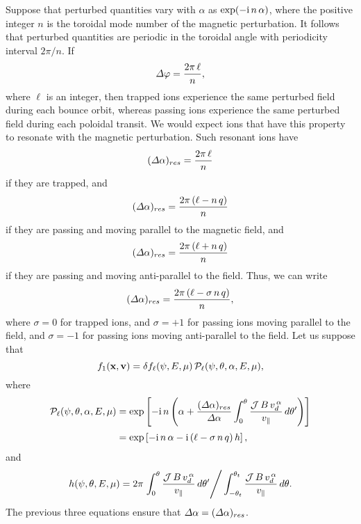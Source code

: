 \documentclass[12pt,prb,aps,notitlepage]{revtex4-1}
\begin{document}
 Suppose that perturbed quantities vary with $\alpha$ as $\exp(-{\rm i}\,n\,\alpha)$, where the positive integer $n$ is the toroidal
 mode number of the magnetic perturbation. It follows that perturbed quantities are periodic in the toroidal angle with periodicity interval $2\pi/n$. If
 \begin{equation}
 {\mit\Delta}\varphi = \frac{2\pi\,\ell}{n},
 \end{equation}
 where $\ell$ is an integer, then trapped ions experience the same perturbed field during each  bounce orbit, whereas passing
 ions experience the same perturbed field during each poloidal transit.  We would expect ions that have this property to resonate with the
 magnetic perturbation. Such resonant ions have
 \begin{equation}
 ({\mit\Delta}\alpha)_{res} = \frac{2\pi\,\ell}{n}
 \end{equation}
 if they are trapped, and 
 \begin{equation}
 ({\mit\Delta}\alpha)_{res} = \frac{2\pi\,(\ell-n\,q)}{n}
 \end{equation}
 if they are passing and moving parallel to the magnetic field, and 
  \begin{equation}
 ({\mit\Delta}\alpha)_{res} = \frac{2\pi\,(\ell+n\,q)}{n}
 \end{equation}
 if they are passing and  moving anti-parallel to the field.
Thus, we can write
  \begin{equation}
 ({\mit\Delta}\alpha)_{res} = \frac{2\pi\,(\ell-\sigma\,n\,q)}{n},
 \end{equation}
 where $\sigma=0$ for trapped ions, and $\sigma=+1$ for passing ions moving parallel to the field, and $\sigma=-1$ for passing ions moving anti-parallel to the field. Let us suppose that
 \begin{equation}\label{e83}
 f_1({\bf x},{\bf v})= \delta f_{\ell}(\psi,E,\mu)\,{\cal P}_{\ell}(\psi,\theta,\alpha,E,\mu),
 \end{equation}
 where
 \begin{align}
 {\cal P}_\ell(\psi,\theta,\alpha,E,\mu)& = \exp\left[-{\rm i}\,n\left(\alpha + \frac{({\mit\Delta}\alpha)_{res}}{{\mit\Delta}\alpha}\int_0^\theta\frac{{\cal J}\,B\,v_d^{\,\alpha}}{v_\parallel}\, d\theta'\right)\right]\nonumber\\[0.5ex]
 & = \exp\left[-{\rm i}\,n\,\alpha -{\rm i}\,(\ell - \sigma\,n\,q)\,h\right],
 \end{align}
 and
 \begin{equation}\label{e85}
 h(\psi,\theta,E,\mu)=2\pi \left.\int_0^\theta\frac{{\cal J}\,B\,v_d^{\,\alpha}}{v_\parallel}\, d\theta' \right/
 \int_{-\theta_t}^{\theta_t}\frac{{\cal J}\,B\,v_d^{\,\alpha}}{v_\parallel}\,d\theta.
 \end{equation}
 The previous three equations ensure that ${\mit\Delta}\alpha= ({\mit\Delta}\alpha)_{res}$. 
 
\end{document}
